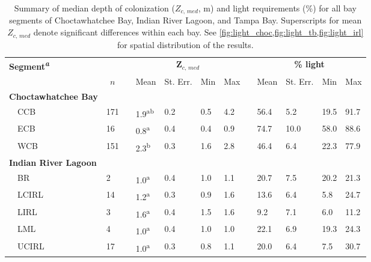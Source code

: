 \documentclass[letterpaper,12pt,oneside]{article}\usepackage[]{graphicx}\usepackage[]{color}
\begin{document}
\begin{table}[!tbp]
{\small
\caption{Summary of median depth of colonization ($Z_{c,\,med}$, m) and light requirements (\%) for all bay segments of Choctawhatchee Bay, Indian River Lagoon, and Tampa Bay.  Superscripts for mean $Z_{c,\,med}$ denote significant differences within each bay. See \cref{fig:light_choc,fig:light_tb,fig:light_irl} for spatial distribution of the results.\label{tab}} 
\begin{center}
\begin{tabular}{llcllllcllll}
\hline\hline
\multicolumn{1}{l}{\bfseries Segment\textsuperscript{\textit{a}}}&\multicolumn{1}{c}{\bfseries }&\multicolumn{1}{c}{\bfseries }&\multicolumn{4}{c}{\bfseries $\mathbf Z_{c,\,med}$}&\multicolumn{1}{c}{\bfseries }&\multicolumn{4}{c}{\bfseries {\bf \% light}}\tabularnewline
\cline{4-7} \cline{9-12}
\multicolumn{1}{l}{}&\multicolumn{1}{c}{$n$}&\multicolumn{1}{c}{}&\multicolumn{1}{c}{Mean}&\multicolumn{1}{c}{St. Err.}&\multicolumn{1}{c}{Min}&\multicolumn{1}{c}{Max}&\multicolumn{1}{c}{}&\multicolumn{1}{c}{Mean}&\multicolumn{1}{c}{St. Err.}&\multicolumn{1}{c}{Min}&\multicolumn{1}{c}{Max}\tabularnewline
\hline
{\bfseries Choctawhatchee Bay}&&&&&&&&&&&\tabularnewline
~~CCB&171&&1.9\textsuperscript{ab}&0.2&0.5&4.2&&56.4& 5.2&19.5&91.7\tabularnewline
~~ECB&16&&0.8\textsuperscript{a}&0.4&0.4&0.9&&74.7&10.0&58.0&88.6\tabularnewline
~~WCB&151&&2.3\textsuperscript{b}&0.3&1.6&2.8&&46.4& 6.4&22.3&77.9\tabularnewline
\hline
{\bfseries Indian River Lagoon}&&&&&&&&&&&\tabularnewline
~~BR&2&&1.0\textsuperscript{a}&0.4&1.0&1.1&&20.7& 7.5&20.2&21.3\tabularnewline
~~LCIRL&14&&1.2\textsuperscript{a}&0.3&0.9&1.6&&13.6& 6.4& 5.8&24.7\tabularnewline
~~LIRL&3&&1.6\textsuperscript{a}&0.4&1.5&1.6&& 9.2& 7.1& 6.0&11.2\tabularnewline
~~LML&4&&1.0\textsuperscript{a}&0.4&1.0&1.0&&22.1& 6.9&19.3&24.3\tabularnewline
~~UCIRL&17&&1.0\textsuperscript{a}&0.3&0.8&1.1&&20.0& 6.4& 7.5&30.7\tabularnewline

\end{tabular}
\end{center}}
\end{table}
\end{document}
